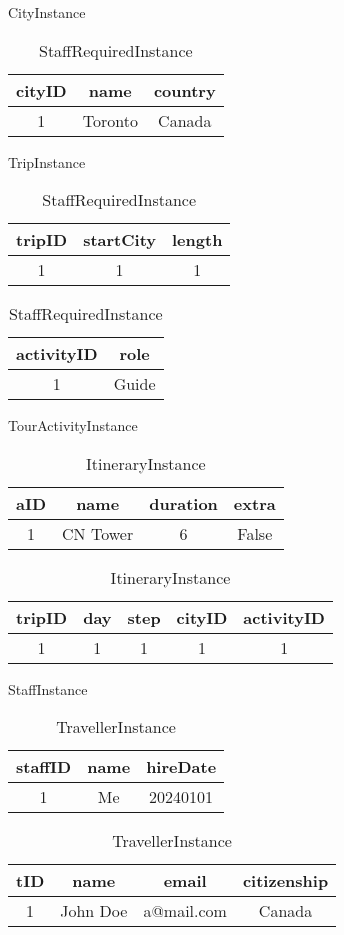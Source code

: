 \documentclass{article}
\begin{document}
\begin{table}[H]
\parbox{.3\linewidth}{
    \centering
    \caption*{CityInstance}
    \begin{tabular}{|c|c|c|} 
    \hline
    cityID & name & country \\ [.5ex] 
    \hline\hline
    1 & Toronto & Canada \\
    \hline
    \end{tabular}
}
\hfill
\parbox{.3\linewidth}{
    \centering
    \caption*{TripInstance}
    \begin{tabular}{|c|c|c|} 
    \hline
    tripID & startCity & length \\ [.5ex] 
    \hline\hline
    1 & 1 & 1 \\
    \hline
    \end{tabular}
}
\hfill
\parbox{.3\linewidth}{
    \centering
    \caption*{StaffRequiredInstance}
    \begin{tabular}{|c|c|} 
    \hline
    activityID & role \\ [.5ex] 
    \hline\hline
    1 & Guide \\
    \hline
    \end{tabular}
}
\end{table}

\begin{table}[H]
\parbox{.45\linewidth}{
    \centering
    \caption*{TourActivityInstance}
    \begin{tabular}{|c|c|c|c|} 
    \hline
    aID & name & duration & extra \\ [.5ex] 
    \hline\hline
    1 & CN Tower & 6 & False \\
    \hline
    \end{tabular}
}
\hfill
\parbox{.45\linewidth}{
    \centering
    \caption*{ItineraryInstance}
    \begin{tabular}{|c|c|c|c|c|} 
    \hline
    tripID & day & step & cityID & activityID \\ [.5ex] 
    \hline\hline
    1 & 1 & 1 & 1 & 1 \\
    \hline
    \end{tabular}
}
\end{table}

\begin{table}[H]
\parbox{.45\linewidth}{
    \centering
    \caption*{StaffInstance}
    \begin{tabular}{|c|c|c|}
    \hline
    staffID & name & hireDate \\ [.5 ex]
    \hline\hline
    1 & Me & 20240101 \\
    \hline
    \end{tabular}
}
\hfill
\parbox{.45\linewidth}{
    \centering
    \caption*{TravellerInstance}
    \begin{tabular}{|c|c|c|c|}
    \hline
    tID & name & email & citizenship \\ [.5 ex]
    \hline\hline
    1 & John Doe & a@mail.com & Canada \\
    \hline
    \end{tabular}
}
\end{table}
\end{document}
